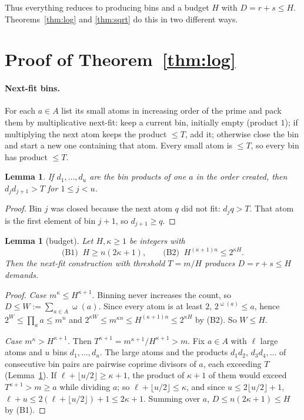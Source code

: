 \documentclass[11pt]{article}
\newtheorem{lemma}[theorem]{Lemma}
\theoremstyle{definition}
\DeclareMathOperator{\om}{\omega}
\begin{document}
Thus everything reduces to producing bins and a budget $H$ with $D=r+s\le H$. Theorems~\ref{thm:log} and
\ref{thm:sqrt} do this in two different ways.

\section{Proof of Theorem~\ref{thm:log}}\label{sec:log}

\paragraph{Next-fit bins.} For each $a\in A$ list its small atoms in increasing order of the prime and pack
them by multiplicative next-fit: keep a current bin, initially empty (product $1$); if multiplying the next
atom keeps the product $\le T$, add it; otherwise close the bin and start a new one containing that atom.
Every small atom is $\le T$, so every bin has product $\le T$.

\begin{lemma}\label{lem:nextfit}
If $d_1,\dots,d_u$ are the bin products of one $a$ in the order created, then $d_jd_{j+1}>T$ for $1\le j<u$.
\end{lemma}
\begin{proof}
Bin $j$ was closed because the next atom $q$ did not fit: $d_jq>T$. That atom is the first element of bin
$j+1$, so $d_{j+1}\ge q$.
\end{proof}

\begin{lemma}[budget]\label{lem:budget}
Let $H,\kappa\ge 1$ be integers with
\begin{equation}\label{eq:B}
 \text{(B1)}\;\; H\ge n(2\kappa+1),\qquad\text{(B2)}\;\; H^{(\kappa+1)n}\le 2^{\kappa H}.
\end{equation}
Then the next-fit construction with threshold $T=m/H$ produces $D=r+s\le H$ demands.
\end{lemma}
\begin{proof}
\emph{Case $m^\kappa\le H^{\kappa+1}$.} Binning never increases the count, so $D\le W:=\sum_{a\in A}\om(a)$.
Since every atom is at least $2$, $2^{\om(a)}\le a$, hence $2^W\le\prod_a a\le m^n$ and
$2^{\kappa W}\le m^{\kappa n}\le H^{(\kappa+1)n}\le 2^{\kappa H}$ by (B2). So $W\le H$.

\emph{Case $m^\kappa>H^{\kappa+1}$.} Then $T^{\kappa+1}=m^{\kappa+1}/H^{\kappa+1}>m$. Fix $a\in A$ with
$\ell$ large atoms and $u$ bins $d_1,\dots,d_u$. The large atoms and the products $d_1d_2,\,d_3d_4,\dots$ of
consecutive bin pairs are pairwise coprime divisors of $a$, each exceeding $T$ (Lemma~\ref{lem:nextfit}).
If $\ell+\lfloor u/2\rfloor\ge\kappa+1$, the product of $\kappa+1$ of them would exceed $T^{\kappa+1}>m\ge a$
while dividing $a$; so $\ell+\lfloor u/2\rfloor\le\kappa$, and since $u\le 2\lfloor u/2\rfloor+1$,
$\ell+u\le 2(\ell+\lfloor u/2\rfloor)+1\le 2\kappa+1$. Summing over $a$, $D\le n(2\kappa+1)\le H$ by (B1).
\end{proof}
\end{document}
